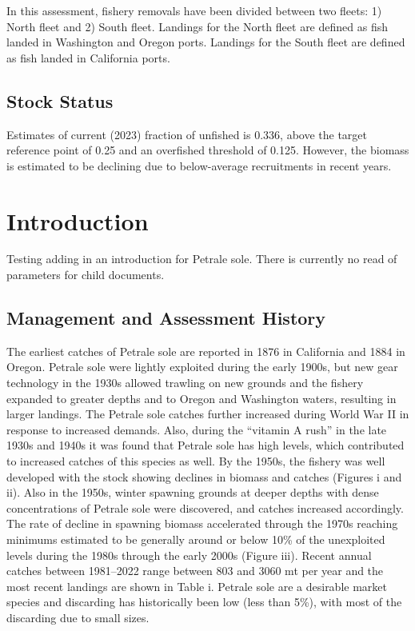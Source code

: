 \documentclass[
]{scrartcl}
\begin{document}
In this assessment, fishery removals have been divided between two
fleets: 1) North fleet and 2) South fleet. Landings for the North fleet
are defined as fish landed in Washington and Oregon ports. Landings for
the South fleet are defined as fish landed in California ports.

\subsection{Stock Status}\label{stock-status}

Estimates of current (2023) fraction of unfished is 0.336, above the
target reference point of 0.25 and an overfished threshold of 0.125.
However, the biomass is estimated to be declining due to below-average
recruitments in recent years.

\newpage{}

\section{Introduction}\label{introduction}

Testing adding in an introduction for Petrale sole. There is currently
no read of parameters for child documents.

\subsection{Management and Assessment
History}\label{management-and-assessment-history}

The earliest catches of Petrale sole are reported in 1876 in California
and 1884 in Oregon. Petrale sole were lightly exploited during the early
1900s, but new gear technology in the 1930s allowed trawling on new
grounds and the fishery expanded to greater depths and to Oregon and
Washington waters, resulting in larger landings. The Petrale sole
catches further increased during World War II in response to increased
demands. Also, during the ``vitamin A rush'' in the late 1930s and 1940s
it was found that Petrale sole has high levels, which contributed to
increased catches of this species as well. By the 1950s, the fishery was
well developed with the stock showing declines in biomass and catches
(Figures i and ii). Also in the 1950s, winter spawning grounds at deeper
depths with dense concentrations of Petrale sole were discovered, and
catches increased accordingly. The rate of decline in spawning biomass
accelerated through the 1970s reaching minimums estimated to be
generally around or below 10\% of the unexploited levels during the
1980s through the early 2000s (Figure iii). Recent annual catches
between 1981--2022 range between 803 and 3060 mt per year and the most
recent landings are shown in Table i. Petrale sole are a desirable
market species and discarding has historically been low (less than 5\%),
with most of the discarding due to small sizes.
\end{document}
